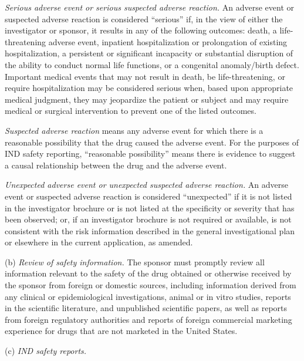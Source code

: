 \textit{Serious adverse event or serious suspected adverse reaction.} An adverse event or suspected adverse reaction is considered ``serious'' if, in the view of either the investigator or sponsor, it results in any of the following outcomes: death, a life-threatening adverse event, inpatient hospitalization or prolongation of existing hospitalization, a persistent or significant incapacity or substantial disruption of the ability to conduct normal life functions, or a congenital anomaly/birth defect. Important medical events that may not result in death, be life-threatening, or require hospitalization may be considered serious when, based upon appropriate medical judgment, they may jeopardize the patient or subject and may require medical or surgical intervention to prevent one of the listed outcomes.

\textit{Suspected adverse reaction} means any adverse event for which there is a reasonable possibility that the drug caused the adverse event. For the purposes of IND safety reporting, ``reasonable possibility'' means there is evidence to suggest a causal relationship between the drug and the adverse event.

\textit{Unexpected adverse event or unexpected suspected adverse reaction.} An adverse event or suspected adverse reaction is considered ``unexpected'' if it is not listed in the investigator brochure or is not listed at the specificity or severity that has been observed; or, if an investigator brochure is not required or available, is not consistent with the risk information described in the general investigational plan or elsewhere in the current application, as amended.

(b) \textit{Review of safety information.} The sponsor must promptly review all information relevant to the safety of the drug obtained or otherwise received by the sponsor from foreign or domestic sources, including information derived from any clinical or epidemiological investigations, animal or in vitro studies, reports in the scientific literature, and unpublished scientific papers, as well as reports from foreign regulatory authorities and reports of foreign commercial marketing experience for drugs that are not marketed in the United States.

(c) \textit{IND safety reports.}

